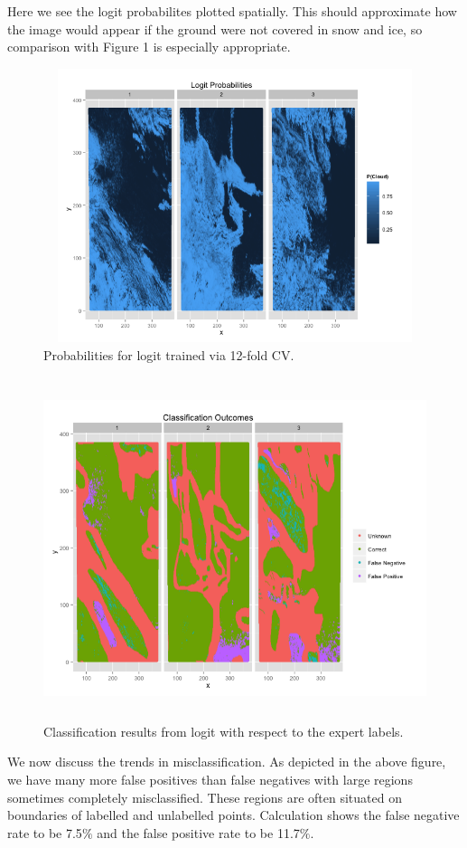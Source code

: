 \documentclass{article}\usepackage[]{graphicx}\usepackage[]{color}
\begin{document}
Here we see the logit probabilites plotted spatially. This should approximate how the image would appear if the ground were not covered in snow and ice, so comparison with Figure 1 is especially appropriate. 
\begin{figure}[H]
\includegraphics[width = 18cm, height = 8cm]{LogitProbabilities.png}
\caption{Probabilities for logit trained via 12-fold CV.}
\end{figure}

\begin{figure}[H]
\includegraphics[width = 18cm, height = 10cm]{ClassificationOutcomes.png}
\caption{Classification results from logit with respect to the expert labels.}
\end{figure}

We now discuss the trends in misclassification. As depicted in the above figure, we have many more false positives than false negatives with large regions sometimes completely misclassified. These regions are often situated on boundaries of labelled and unlabelled points. Calculation shows the false negative rate to be 7.5$\%$ and the false positive rate to be 11.7$\%$. 
\end{document}
